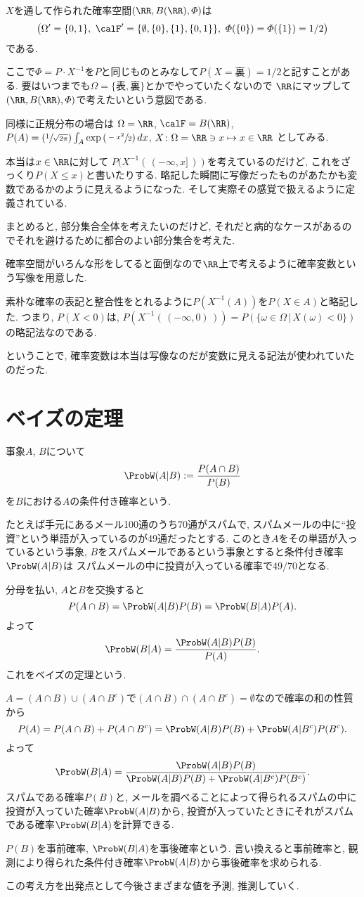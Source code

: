 $X$を通して作られた確率空間$(\RR,B(\RR),\varPhi)$は
$$
\left(
  \Omega'=\{0, 1\},\
  \calF'=\{\emptyset, \{0\}, \{1\}, \{0,1\} \},\
  \varPhi(\{0\})=\varPhi(\{1\})=1/2
\right)
$$
である.

ここで$\varPhi  = P\cdot X^{-1}$を$P$と同じものとみなして$P(X = {裏}) = 1/2$と記すことがある.
要はいつまでも$\Omega = \{表, 裏\}$とかでやっていたくないので
$\RR$にマップして$(\RR, B(\RR), \varPhi )$で考えたいという意図である.

同様に正規分布の場合は
$\Omega = \RR$,
$\calF = B(\RR)$,
$P(A) = \left(\sfrac{1}{\sqrt{2\pi}}\right) \int_A \exp\left({\sfrac{-x^2}{2}}\right)dx$,
$X\colon \Omega = \RR \ni  x \mapsto x \in \RR$
としてみる.

本当は$x \in  \RR$に対して $P(X^{-1}(\,(-\infty , x]\,))$を考えているのだけど, これをざっくり$P(X \le x)$と書いたりする.
略記した瞬間に写像だったものがあたかも変数であるかのように見えるようになった. そして実際その感覚で扱えるように定義されている.

まとめると, 部分集合全体を考えたいのだけど, それだと病的なケースがあるのでそれを避けるために都合のよい部分集合を考えた.

確率空間がいろんな形をしてると面倒なので$\RR$上で考えるように確率変数という写像を用意した.

素朴な確率の表記と整合性をとれるように$P(X^{-1}(A))$を$P(X \in A)$と略記した.
つまり, $P(X < 0)$は, $P(X^{-1}(\,(-\infty,0)\,))
 = P(\{\omega \in \Omega\,|\,X(\omega ) < 0\})$の略記法なのである.

ということで, 確率変数は本当は写像なのだが変数に見える記法が使われていたのだった.

\section{ベイズの定理}
事象$A$, $B$について
$$
\ProbW(A|B):=\frac{P(A\cap B)}{P(B)}
$$
を$B$における$A$の条件付き確率という.

たとえば手元にあるメール100通のうち70通がスパムで, スパムメールの中に“投資”という単語が入っているのが49通だったとする.
このとき$A$をその単語が入っているという事象, $B$をスパムメールであるという事象とすると条件付き確率$\ProbW(A|B)$は
スパムメールの中に投資が入っている確率で$49/70$となる.

分母を払い, $A$と$B$を交換すると
$$
P(A\cap B)=\ProbW(A|B)P(B)=\ProbW(B|A)P(A).
$$
よって
$$
\ProbW(B|A)=\frac{\ProbW(A|B)P(B)}{P(A)}.
$$
これをベイズの定理という.

$A=(A \cap B) \cup (A \cap B^c)$で$(A \cap B) \cap (A \cap B^c)=\emptyset$なので確率の和の性質から
$$
P(A)=P(A \cap B) + P(A \cap B^c)=\ProbW(A|B)P(B)+\ProbW(A|B^c)P(B^c).
$$
よって
$$
\ProbW(B|A)=\frac{\ProbW(A|B)P(B)}{\ProbW(A|B)P(B)+\ProbW(A|B^c)P(B^c)}.
$$
スパムである確率$P(B)$と, メールを調べることによって得られるスパムの中に投資が入っていた確率$\ProbW(A|B)$から,
投資が入っていたときにそれがスパムである確率$\ProbW(B|A)$を計算できる.

$P(B)$を事前確率, $\ProbW(B|A)$を事後確率という.
言い換えると事前確率と, 観測により得られた条件付き確率$\ProbW(A|B)$から事後確率を求められる.

この考え方を出発点として今後さまざまな値を予測, 推測していく.
